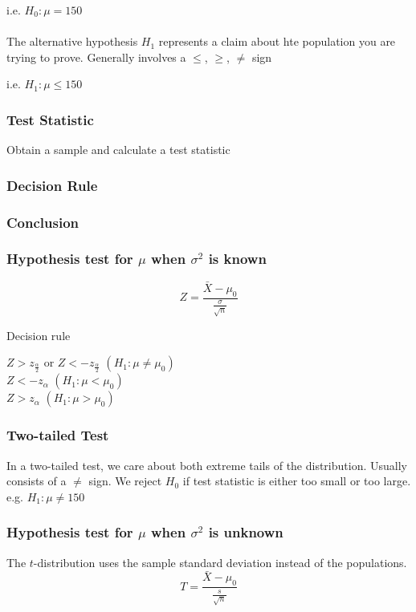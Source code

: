 \documentclass{article}
\begin{document}
i.e. $H_0 : \mu = 150$
\\
\\
The alternative hypothesis $H_1$ represents a claim about hte population you are trying to prove. Generally involves a $\leq$, $\geq$, $\neq$ sign

i.e. $H_1 : \mu \leq 150$

\subsubsection{Test Statistic}
Obtain a sample and calculate a test statistic

\subsubsection{Decision Rule}

\subsubsection{Conclusion}

\subsubsection{Hypothesis test for $\mu$ when $\sigma^2$ is known}

$$
Z = \frac{\bar{X} - \mu_0}{\frac{\sigma}{\sqrt{n}}}
$$

Decision rule

$Z > z_{\frac{\alpha}{2}}$ or $Z < -z_{\frac{\alpha}{2}}$ $(H_1 : \mu \neq \mu_0)$
\\

$Z < -z_{\alpha}$ $(H_1 : \mu < \mu_0)$
\\

$Z > z_{\alpha}$ $(H_1 : \mu > \mu_0)$



\subsubsection{Two-tailed Test}
In a two-tailed test, we care about both extreme tails of the distribution. Usually consists of a $\neq$ sign. We reject $H_0$ if test statistic is either too small or too large.
e.g. $ H_1 : \mu \neq 150$

\subsubsection{Hypothesis test for $\mu$ when $\sigma^2$ is unknown}
The $t$-distribution uses the sample standard deviation instead of the populations.
$$
T = \frac{\bar{X} - \mu_0}{\frac{s}{\sqrt{n}}}
$$
\end{document}
